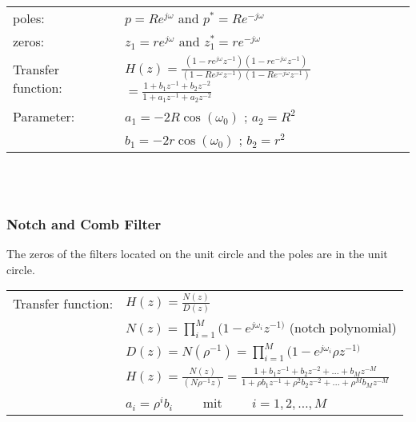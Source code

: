 \begin{tabularx}{1\textwidth}{l X}
	poles: & $ p = R e^{j\omega}$ \qquad and \qquad $ p^* = R e^{-j\omega}$
	\\ 
	zeros: & $ z_1 = r e^{j\omega}$ \qquad and \qquad $ z_1^* = r e^{-j\omega}$
	\\
	Transfer function: & $H(z)= \frac{(1-r e^{j\omega}z^{-1})(1-re^{-j\omega}z^{-1})}{(1-R e^{j\omega}z^{-1})(1-Re^{-j\omega}z^{-1})}$\
	$=\frac{1+b_1z^{-1}+b_2z^{-2}}{1+a_1z^{-1}+a_2z^{-2}}$
	\\ 
	Parameter: & $a_1 = -2R\cos(\omega_0)$ \qquad; \qquad $a_2 = R^2$
	\\ 
	& $b_1 = -2r\cos(\omega_0)$ \qquad; \qquad $b_2 = r^2$
\end{tabularx}\\ \\

\subsubsection{Notch and Comb Filter}
The zeros of the filters located on the unit circle and the poles are in the unit
circle.

\begin{tabularx}{1\textwidth}{l X}
	Transfer function: & $H(z) = \frac{N(z)}{D(z)} $
	\\
	& $N(z) = \prod\limits_{i=1}^{M}(1- e^{j\omega_i}z^{-1)} $ \qquad (notch polynomial)
	\\
	& $D(z) = N(\rho^{-1})  = \prod\limits_{i=1}^{M}(1- e^{j\omega_i}\rho z^{-1)} $
	\\
	& $H(z) = \frac{N(z)}{(N\rho^{-1}z)}= \frac{1+b_1 z^{-1} + b_2z^{-2} + \ldots + b_M z^{-M}}
	{1+\rho b_1 z^{-1} + \rho^2 b_2z^{-2} + \ldots + \rho^M b_M z^{-M}} $\\
	&$a_i=\rho^ib_i \qquad$ mit $\qquad i=1,2,\ldots,M$ \\
	\end{tabularx}\\ \\

